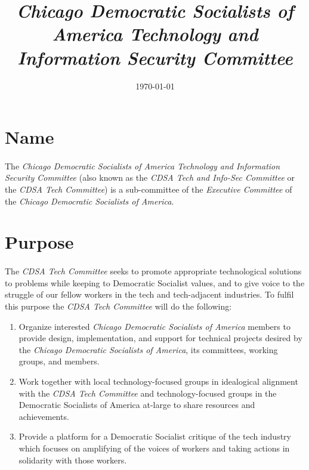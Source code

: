 \documentclass[12pt,letter,twocolumn,oneside,draft]{article}
\newcommand{\committeename}{\emph{Chicago Democratic Socialists of America Technology and Information Security Committee}}
\newcommand{\cname}{\emph{CDSA Tech Committee}}
\newcommand{\cdsa}{\emph{Chicago Democratic Socialists of America}}
\begin{document}
\title{\committeename{}}
\date{\today}
\maketitle



\tableofcontents



\setcounter{secnumdepth}{5}

\section{Name}

\paragraph{}
The \committeename{} (also known as the \emph{CDSA Tech and Info-Sec Committee}
or the \cname{}) is a sub-committee of the \emph{Executive Committee} of the
\emph{Chicago Democratic Socialists of America}.


\section{Purpose}

\paragraph{}
The \cname{} seeks to promote appropriate technological solutions to problems
while keeping to Democratic Socialist values, and to give voice to the struggle
of our fellow workers in the tech and tech-adjacent industries. To fulfil this
purpose the \cname{} will do the following:

\begin{enumerate}
    \item{Organize interested \cdsa{} members to provide design,
        implementation, and support for technical projects desired by the
        \cdsa{}, its committees, working groups, and members.}
    \item{Work together with local technology-focused groups in idealogical
        alignment with the \cname{} and technology-focused groups in the
        Democratic Socialists of America at-large to share resources and
        achievements.}
    \item{Provide a platform for a Democratic Socialist critique of the tech
        industry which focuses on amplifying of the voices of workers and
        taking actions in solidarity with those workers.}
\end{enumerate}
\end{document}
